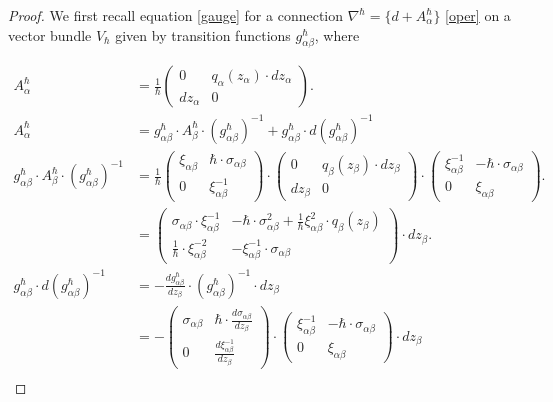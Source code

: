 \documentclass[oneside, 11pt]{amsart}
\theoremstyle{definition}
\numberwithin{equation}{subsection}
\def\a{\alpha}
\def\b{\beta}
\begin{document}
\begin{proof}
We first recall equation \eqref{gauge} for a connection $\nabla^{\hbar}=\{d+A^{\hbar}_{\a}\}$ \eqref{oper} on a vector bundle $V_{\hbar}$ given by transition functions $g_{\a\b}^{\hbar}$, where 

\begin{align}
\nonumber
A^{\hbar}_{\a}&=\frac{1}{\hbar}\begin{pmatrix}\label{connection}
0&q_\a(z_{\a})\cdot dz_{\a}\\ dz_{\a}& 0
\end{pmatrix}.\\
A^{\hbar}_{\a}&=g_{\a\b}^{\hbar} \cdot A^{\hbar}_{\b}\cdot (g_{\a\b}^{\hbar})^{-1}+g_{\a\b}^{\hbar}\cdot d(g_{\a\b}^{\hbar})^{-1}\\
\nonumber
g_{\a\b}^{\hbar} \cdot A^{\hbar}_{\b}\cdot (g_{\a\b}^{\hbar})^{-1}&=\frac{1}{\hbar}
\begin{pmatrix}
\xi_{\a\b}&\hbar\cdot \sigma_{\a\b}\\ 0& \xi^{-1}_{\a\b}
\end{pmatrix}\cdot
\begin{pmatrix}
0&q_\b(z_{\b})\cdot dz_{\b}\\ dz_{\b}& 0
\end{pmatrix}\cdot
\begin{pmatrix}
\xi_{\a\b}^{-1}&-\hbar\cdot\sigma_{\a\b}\\ 0& \xi_{\a\b}
\end{pmatrix}.\\
\nonumber
&=\begin{pmatrix}
\sigma_{\a\b}\cdot\xi_{\a\b}^{-1}&-\hbar\cdot\sigma_{\a\b}^2+ \frac{1}{\hbar}\xi_{\a\b}^2\cdot q_\b(z_{\b})\\ \frac{1}{\hbar}\cdot\xi_{\a\b}^{-2}& -\xi_{\a\b}^{-1}\cdot \sigma_{\a\b}
\end{pmatrix}\cdot dz_{\b}.\\
\nonumber
g_{\a\b}^{\hbar}\cdot d(g_{\a\b}^{\hbar})^{-1}&=-\frac{dg_{\a\b}^{\hbar}}{dz_{\b}}\cdot(g_{\a\b}^{\hbar})^{-1}\cdot dz_{\b}\\
\nonumber
&=-\begin{pmatrix}
\sigma_{\a\b}&\hbar\cdot\frac{d\sigma_{\a\b}}{dz_{\b}}\\ 0& \frac{d\xi^{-1}_{\a\b}}{dz_{\b}}
\end{pmatrix}\cdot \begin{pmatrix}
\xi_{\a\b}^{-1}&-\hbar\cdot\sigma_{\a\b}\\ 0& \xi_{\a\b}
\end{pmatrix}\cdot dz_{\b}\\

\end{align}
\end{proof}
\end{document}
